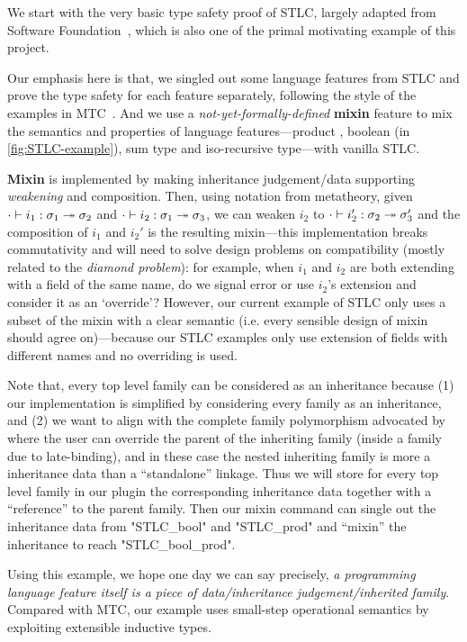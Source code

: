 We start with the very basic type safety proof of STLC, largely adapted
from Software Foundation~\cite{pierce2014software}, which is also one of
the primal motivating example of this project. 


Our emphasis here is that, we singled out some language features from
STLC and prove the type safety for each feature separately, following
the style of the examples in MTC~\cite{delaware2013,forsta2020}.
And we use a \textit{not-yet-formally-defined} \textbf{mixin} feature
to mix the semantics and properties of language features---product
, boolean (in \cref{fig:STLC-example}), sum type and iso-recursive type---with vanilla STLC.

\textbf{Mixin} is implemented by making inheritance judgement/data supporting \textit{weakening} and composition. Then, using notation from metatheory, given ${ {\cdot} \vdash {i_1} : {\sigma_1} \twoheadrightarrow {\sigma_2}}$ and ${ {\cdot} \vdash {i_2} : {\sigma_1} \twoheadrightarrow {\sigma_3}}$, we can weaken $i_2$ to ${ {\cdot} \vdash {i_2'} : {\sigma_2} \twoheadrightarrow {\sigma_3'}}$ and the composition of $i_1$ and $i_2'$ is the resulting mixin---this implementation breaks commutativity and will need to solve design problems on compatibility (mostly related to the \textit{diamond problem}): for example, when $i_1$ and $i_2$ are both extending with a field of the same name, do we signal error or use $i_2$'s extension and consider it as an `override'? However, our current example of STLC only uses a subset of the mixin with a clear semantic (i.e. every sensible design of mixin should agree on)---because our STLC examples only use extension of fields with different names and no overriding is used. 

Note that, every top level family can be considered as an inheritance because (1) our implementation is simplified by considering every family as an inheritance, and (2) we want to align with the complete family polymorphism advocated by \citet{zm2017} where the user can override the parent of the inheriting family (inside a family due to late-binding), and in these case the nested inheriting family is more a inheritance data than a ``standalone'' linkage. Thus we will store for every top level family in our plugin the corresponding inheritance data together with a ``reference'' to the parent family. Then our mixin command can single out the inheritance data from "STLC_bool" and "STLC_prod" and ``mixin'' the inheritance to reach "STLC_bool_prod". 

Using this example,
we hope one day we can say precisely, \textit{a programming language feature itself is a
piece of data/inheritance judgement/inherited family}. Compared with MTC,
our example uses small-step operational semantics by exploiting
extensible inductive types. 

